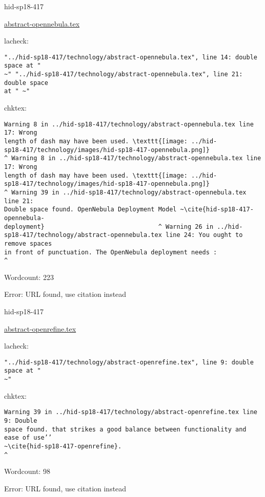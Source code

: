 \begin{IU}

hid-sp18-417

\href{https://github.com/cloudmesh-community/hid-sp18-417/blob/master//technology/abstract-opennebula.tex}{abstract-opennebula.tex}

 
lacheck:
\begin{tiny}
\begin{verbatim}
"../hid-sp18-417/technology/abstract-opennebula.tex", line 14: double space at "
~" "../hid-sp18-417/technology/abstract-opennebula.tex", line 21: double space
at " ~"
\end{verbatim}
\end{tiny}
chktex:
\begin{tiny}
\begin{verbatim}
Warning 8 in ../hid-sp18-417/technology/abstract-opennebula.tex line 17: Wrong
length of dash may have been used. \texttt{[image: ../hid-
sp18-417/technology/images/hid-sp18-417-opennebula.png]}
^ Warning 8 in ../hid-sp18-417/technology/abstract-opennebula.tex line 17: Wrong
length of dash may have been used. \texttt{[image: ../hid-
sp18-417/technology/images/hid-sp18-417-opennebula.png]}
^ Warning 39 in ../hid-sp18-417/technology/abstract-opennebula.tex line 21:
Double space found. OpenNebula Deployment Model ~\cite{hid-sp18-417-opennebula-
deployment}                               ^ Warning 26 in ../hid-
sp18-417/technology/abstract-opennebula.tex line 24: You ought to remove spaces
in front of punctuation. The OpenNebula deployment needs :
^
\end{verbatim}
\end{tiny}

Wordcount: 223

Error: URL found, use citation instead
\end{IU}



\begin{IU}

hid-sp18-417

\href{https://github.com/cloudmesh-community/hid-sp18-417/blob/master//technology/abstract-openrefine.tex}{abstract-openrefine.tex}

 
lacheck:
\begin{tiny}
\begin{verbatim}
"../hid-sp18-417/technology/abstract-openrefine.tex", line 9: double space at "
~"
\end{verbatim}
\end{tiny}
chktex:
\begin{tiny}
\begin{verbatim}
Warning 39 in ../hid-sp18-417/technology/abstract-openrefine.tex line 9: Double
space found. that strikes a good balance between functionality and ease of use’’
~\cite{hid-sp18-417-openrefine}.
^
\end{verbatim}
\end{tiny}

Wordcount: 98

Error: URL found, use citation instead
\end{IU}

